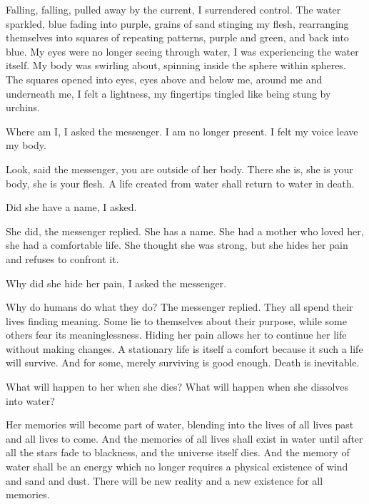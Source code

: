 \documentclass[12pt, letterpaper]{report}
\begin{document}
\vspace{1\baselineskip}
Falling, falling, pulled away by the current, I surrendered control. The water sparkled, blue fading into purple, grains of sand stinging my flesh, rearranging themselves into squares of repeating patterns, purple and green, and back into blue. My eyes were no longer seeing through water, I was experiencing the water itself. My body was swirling about, spinning inside the sphere within spheres. The squares opened into eyes, eyes above and below me, around me and underneath me, I felt a lightness, my fingertips tingled like being stung by urchins.

\vspace{1\baselineskip}
Where am I, I asked the messenger. I am no longer present. I felt my voice leave my body. 

\vspace{1\baselineskip}
Look, said the messenger, you are outside of her body. There she is, she is your body, she is your flesh. A life created from water shall return to water in death. 

\vspace{1\baselineskip}
Did she have a name, I asked. 

\vspace{1\baselineskip}
She did, the messenger replied. She has a name. She had a mother who loved her, she had a comfortable life. She thought she was strong, but she hides her pain and refuses to confront it.

\vspace{1\baselineskip}
Why did she hide her pain, I asked the messenger.

\vspace{1\baselineskip}
Why do humans do what they do? The messenger replied. They all spend their lives finding meaning. Some lie to themselves about their purpose, while some others fear its meaninglessness. Hiding her pain allows her to continue her life without making changes. A stationary life is itself a comfort because it such a life will survive. And for some, merely surviving is good enough. Death is inevitable.

\vspace{1\baselineskip}
What will happen to her when she dies? What will happen when she dissolves into water?

\vspace{1\baselineskip}
Her memories will become part of water, blending into the lives of all lives past and all lives to come. And the memories of all lives shall exist in water until after all the stars fade to blackness, and the universe itself dies. And the memory of water shall be an energy which no longer requires a physical existence of wind and sand and dust. There will be new reality and a new existence for all memories.
\end{document}
